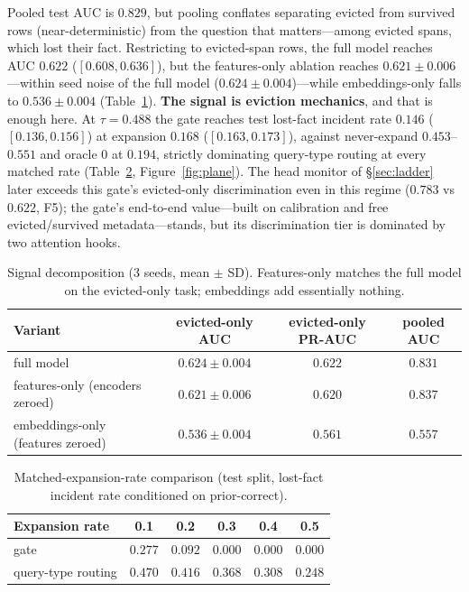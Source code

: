 \documentclass[11pt]{article}
\newcommand{\lostfact}{lost-fact incident rate}
\begin{document}
Pooled test AUC is $0.829$, but pooling conflates separating evicted from
survived rows (near-deterministic) from the question that matters---among
evicted spans, which lost their fact. Restricting to evicted-span rows, the
full model reaches AUC $\mathbf{0.622}$ ($[0.608, 0.636]$), but the
features-only ablation reaches $0.621 \pm 0.006$---within seed noise of the
full model ($0.624 \pm 0.004$)---while embeddings-only falls to $0.536 \pm
0.004$ (Table~\ref{tab:decomposition}). \textbf{The signal is eviction
mechanics}, and that is enough here. At $\tau{=}0.488$ the gate reaches test
\lostfact{} $0.146$ ($[0.136, 0.156]$) at expansion $0.168$ ($[0.163,
0.173]$), against never-expand $0.453$--$0.551$ and oracle $0$ at $0.194$,
strictly dominating query-type routing at every matched rate
(Table~\ref{tab:gt8}, Figure~\ref{fig:plane}). The head monitor of
\S\ref{sec:ladder} later exceeds this gate's evicted-only discrimination
even in this regime ($0.783$ vs $0.622$, F5); the gate's end-to-end
value---built on calibration and free evicted/survived metadata---stands,
but its discrimination tier is dominated by two attention hooks.

\begin{table}[t]
\centering
\small
\caption{Signal decomposition (3 seeds, mean $\pm$ SD). Features-only
matches the full model on the evicted-only task; embeddings add essentially
nothing.}
\label{tab:decomposition}
\begin{tabular}{lccc}
\toprule
Variant & evicted-only AUC & evicted-only PR-AUC & pooled AUC \\
\midrule
full model & $0.624 \pm 0.004$ & $0.622$ & $0.831$ \\
features-only (encoders zeroed) & $0.621 \pm 0.006$ & $0.620$ & $0.837$ \\
embeddings-only (features zeroed) & $0.536 \pm 0.004$ & $0.561$ & $0.557$ \\
\bottomrule
\end{tabular}
\end{table}

\begin{table}[t]
\centering
\caption{Matched-expansion-rate comparison (test split, \lostfact{}
conditioned on prior-correct).}
\label{tab:gt8}
\begin{tabular}{lccccc}
\toprule
Expansion rate & 0.1 & 0.2 & 0.3 & 0.4 & 0.5 \\
\midrule
gate & $0.277$ & $0.092$ & $0.000$ & $0.000$ & $0.000$ \\
query-type routing & $0.470$ & $0.416$ & $0.368$ & $0.308$ & $0.248$ \\
\bottomrule
\end{tabular}
\end{table}
\end{document}
